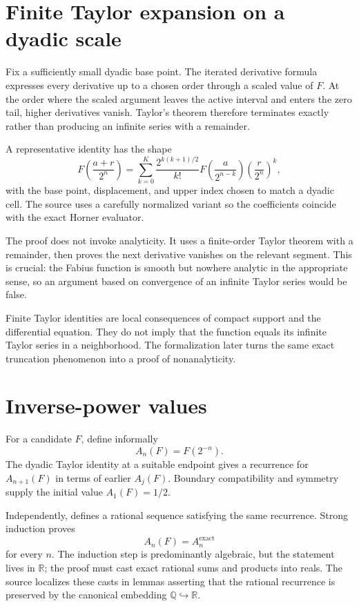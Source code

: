 \documentclass[11pt,oneside]{report}
\theoremstyle{definition}
\theoremstyle{remark}
\DeclareRobustCommand{\file}[1]{\texorpdfstring{\texttt{\expandafter\seqsplit\expandafter{\detokenize{#1}}}}{\detokenize{#1}}}
\newcommand{\R}{\mathbb{R}}
\newcommand{\Q}{\mathbb{Q}}
\begin{document}
\section{Finite Taylor expansion on a dyadic scale}
Fix a sufficiently small dyadic base point.  The iterated derivative formula expresses every derivative up to a chosen order through a scaled value of \(F\).  At the order where the scaled argument leaves the active interval and enters the zero tail, higher derivatives vanish.  Taylor's theorem therefore terminates exactly rather than producing an infinite series with a remainder.

A representative identity has the shape
\[
  F\!\left(\frac{a+r}{2^n}\right)
  =\sum_{k=0}^{K}
    \frac{2^{k(k+1)/2}}{k!}
    F\!\left(\frac{a}{2^{n-k}}\right)
    \left(\frac{r}{2^n}\right)^k,
\]
with the base point, displacement, and upper index chosen to match a dyadic cell.  The source uses a carefully normalized variant so the coefficients coincide with the exact Horner evaluator.

The proof does not invoke analyticity.  It uses a finite-order Taylor theorem with a remainder, then proves the next derivative vanishes on the relevant segment.  This is crucial: the Fabius function is smooth but nowhere analytic in the appropriate sense, so an argument based on convergence of an infinite Taylor series would be false.

\begin{warningbox}
Finite Taylor identities are local consequences of compact support and the differential equation.  They do not imply that the function equals its infinite Taylor series in a neighborhood.  The formalization later turns the same exact truncation phenomenon into a proof of nonanalyticity.
\end{warningbox}

\section{Inverse-power values}
For a candidate \(F\), define informally
\[
  A_n(F)=F(2^{-n}).
\]
The dyadic Taylor identity at a suitable endpoint gives a recurrence for \(A_{n+1}(F)\) in terms of earlier \(A_j(F)\).  Boundary compatibility and symmetry supply the initial value \(A_1(F)=1/2\).

Independently, \file{Arithmetic.lean} defines a rational sequence satisfying the same recurrence.  Strong induction proves
\[
  A_n(F)=A_n^{\mathrm{exact}}
\]
for every \(n\).  The induction step is predominantly algebraic, but the statement lives in \(\R\); the proof must cast exact rational sums and products into reals.  The source localizes these casts in lemmas asserting that the rational recurrence is preserved by the canonical embedding \(\Q\hookrightarrow\R\).
\end{document}
